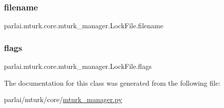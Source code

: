 \subsubsection{\texorpdfstring{filename}{filename}}
{\footnotesize\ttfamily parlai.\+mturk.\+core.\+mturk\+\_\+manager.\+Lock\+File.\+filename}

\mbox{\label{classparlai_1_1mturk_1_1core_1_1mturk__manager_1_1LockFile_ae89be8215dce410b9f1cf34ce40f7108}} 
\subsubsection{\texorpdfstring{flags}{flags}}
{\footnotesize\ttfamily parlai.\+mturk.\+core.\+mturk\+\_\+manager.\+Lock\+File.\+flags\hspace{0.3cm}{\ttfamily [static]}}



The documentation for this class was generated from the following file\+:\begin{DoxyCompactItemize}
\item 
parlai/mturk/core/\hyperlink{mturk__manager_8py}{mturk\+\_\+manager.\+py}\end{DoxyCompactItemize}
